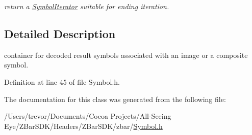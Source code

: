 \begin{DoxyCompactItemize}
\begin{DoxyCompactList}\small\item\em return a \hyperlink{classzbar_1_1_symbol_iterator}{SymbolIterator} suitable for ending iteration. \end{DoxyCompactList}\end{DoxyCompactItemize}


\subsection{Detailed Description}
container for decoded result symbols associated with an image or a composite symbol. 

Definition at line 45 of file Symbol.h.



The documentation for this class was generated from the following file:\begin{DoxyCompactItemize}
\item 
/Users/trevor/Documents/Cocoa Projects/All-\/Seeing Eye/ZBarSDK/Headers/ZBarSDK/zbar/\hyperlink{_symbol_8h}{Symbol.h}\end{DoxyCompactItemize}
